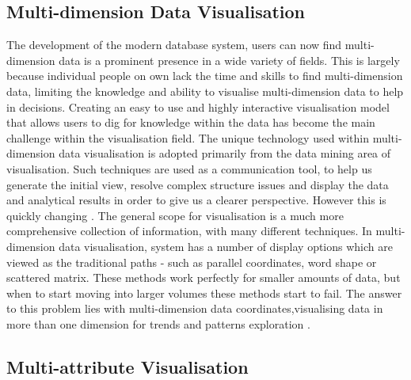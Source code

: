 \subsection{Multi-dimension Data Visualisation}

The development of the modern database system, users can now find multi-dimension data is a prominent presence in a wide variety of fields. This is largely because individual people on own lack the time and skills to find multi-dimension data, limiting the knowledge and ability to visualise multi-dimension data to help in decisions. Creating an easy to use and highly interactive visualisation model that allows users to dig for knowledge within the data has become the main challenge within the visualisation field. The unique technology used within multi-dimension data visualisation is adopted primarily from the data mining area of visualisation. Such techniques are used as a communication tool, to help us generate the initial view, resolve complex structure issues and display the data and analytical results in order to give us a clearer perspective. However this is quickly changing \cite{mothe2003doccube}. The general scope for visualisation is a much more comprehensive collection of information, with many different techniques. In multi-dimension data visualisation, system has a number of display options which are viewed as the traditional paths - such as parallel coordinates, word shape or scattered matrix. These methods work perfectly for smaller amounts of data, but when to start moving into larger volumes these methods start to fail. The answer to this problem lies with multi-dimension data coordinates,visualising data in more than one dimension for trends and patterns exploration \cite{khandelwal2014multi}.

\subsection{Multi-attribute Visualisation}

